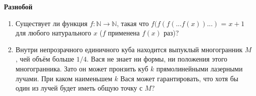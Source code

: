 \documentclass{article}
\begin{document}
\large
	

\begin{center}
\textbf{Разнобой}
\end{center}

\begin{enumerate}[label*=\protect\fbox{\arabic{enumi}}]
	
	\item  Существует ли функция $f: \mathbb{N} \rightarrow \mathbb{N} $, такая что $f(f(f(...f(x))...)$ = $x + 1$ для любого натурального $x$ ($f$ применена $f (x)$ раз)?
	
	\item Внутри непрозрачного единичного куба находится выпуклый многогранник $M$, чей объём больше $1/4$. Вася не знает ни формы, ни положения этого многогранника. Зато он может пронзить куб $k$ прямолинейными лазерными лучами. При каком наименьшем $k$ Вася может гарантировать, что хотя бы один из лучей будет иметь общую точку с $M$?
	



\end{enumerate}
\end{document}
